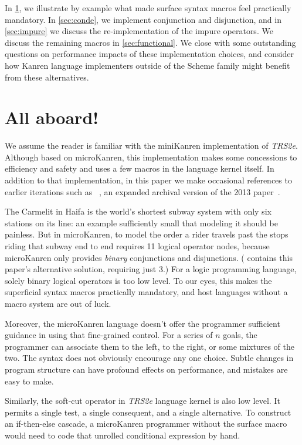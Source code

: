 \documentclass[sigplan,balance,pbalance,natbib=false]{acmart}
\begin{document}
In \cref{sec:all-aboard}, we illustrate by example what made surface
syntax macros feel practically mandatory. In \cref{sec:conde}, we
implement conjunction and disjunction, and in \cref{sec:impure} we
discuss the re-implementation of the impure operators. We discuss the
remaining macros in \cref{sec:functional}. We close with some
outstanding questions on performance impacts of these implementation
choices, and consider how Kanren language implementers outside of the
Scheme family might benefit from these alternatives.

\section{All aboard!}\label{sec:all-aboard}

We assume the reader is familiar with the miniKanren implementation of
\emph{TRS2e}. Although based on microKanren, this implementation makes
some concessions to efficiency and safety and uses a few macros in the
language kernel itself. In addition to that implementation, in this
paper we make occasional references to earlier iterations such as
\citeauthor{hemann2016small}~\cite{hemann2016small}, an expanded
archival version of the 2013 paper~\cite{hemann2013muKanren}.

The Carmelit in Haifa is the world's shortest subway system with only
six stations on its line: an example sufficiently small that modeling
it should be painless. But in microKanren, to model the order a rider
travels past the stops riding that subway end to end requires 11
logical operator nodes, because microKanren only provides
\emph{binary} conjunctions and disjunctions. (
contains this paper's alternative solution, requiring just 3.) For a
logic programming language, solely binary logical operators is too low
level. To our eyes, this makes the superficial syntax macros
practically mandatory, and host languages without a macro system are
out of luck.

Moreover, the microKanren language doesn't offer the programmer
sufficient guidance in using that fine-grained control. For a series
of $n$ goals, the programmer can associate them to the left, to the
right, or some mixtures of the two. The syntax does not obviously
encourage any one choice. Subtle changes in program structure can have
profound effects on performance, and mistakes are easy to make.

Similarly, the soft-cut operator  in \emph{TRS2e}
language kernel is also low level. It permits a single test, a single
consequent, and a single alternative. To construct an if-then-else
cascade, a microKanren programmer without the 
surface macro would need to code that unrolled conditional expression
by hand.
\end{document}
